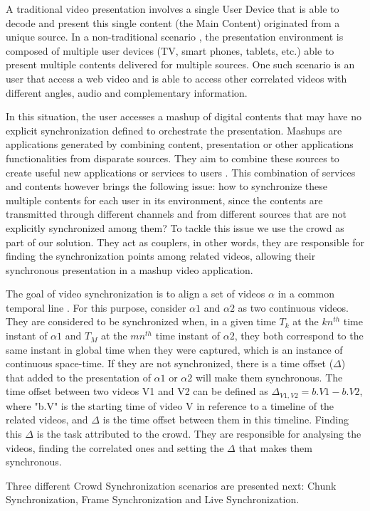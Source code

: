 \label{crowdsync}
A traditional video presentation involves a single User Device that is able to decode and present this single content (the Main Content) originated from a unique source. In a non-traditional scenario \cite{huang2013evolution}, the presentation environment is composed of multiple user devices (TV, smart phones, tablets, etc.) able to present multiple contents delivered for multiple sources. One such scenario is an user that access a web video and is able to access other correlated videos with different angles, audio and complementary information.

In this situation, the user accesses a mashup of digital contents that may have no explicit synchronization defined to orchestrate the  presentation. Mashups are applications generated by combining content, presentation or other applications functionalities from disparate sources. They aim to combine these sources to create useful new applications or services to users \cite{yu2008understanding}. This combination of services and contents however brings the following issue: how to synchronize these multiple contents for each user in its environment, since the contents are transmitted through different channels and from different sources that are not explicitly synchronized among them? To tackle this issue we use the crowd as part of our solution. They act as couplers, in other words, they are responsible for finding the synchronization points among related videos, allowing their synchronous presentation in a mashup video application.

The goal of video synchronization is to align a set of videos $\alpha$ in a common temporal line \cite{segundo2015remote}. For this purpose, consider $\alpha1$ and $\alpha2$ as two continuous videos. They are considered to be synchronized when, in a given time $T_{k}$ at the $kn^{th}$ time instant of $\alpha1$ and $T_{M}$ at the $mn^{th}$ time instant of $\alpha2$, they both correspond to the same instant in global time when they were captured, which is an instance of continuous space-time. If they are not synchronized, there is a time offset ($\Delta$) that added to the presentation of $\alpha1$ or $\alpha2$ will make them synchronous. The time offset between two videos V1 and V2 can be defined as $\Delta_{V1,V2} = b.V1-b.V2$, where "b.V" is the starting time of video V in reference to a timeline of the related videos, and $\Delta$ is the time offset between them in this timeline. Finding this $\Delta$ is the task attributed to the crowd. They are responsible for analysing the videos, finding the correlated ones and setting the $\Delta$ that makes them synchronous.

Three different Crowd Synchronization scenarios are presented next: Chunk Synchronization, Frame Synchronization and Live Synchronization. 
